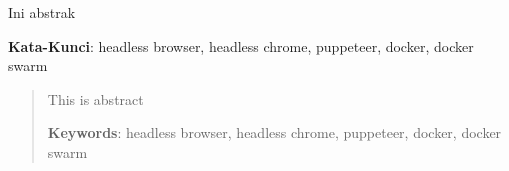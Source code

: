 \begin{abstrak}
		Ini abstrak

	\noindent \textbf{Kata-Kunci}: headless browser, headless chrome, puppeteer, docker, docker swarm
\end{abstrak}
\newpage
\begin{abstract}
		This is abstract

	\noindent \textbf{Keywords}: headless browser, headless chrome, puppeteer, docker, docker swarm
\end{abstract}